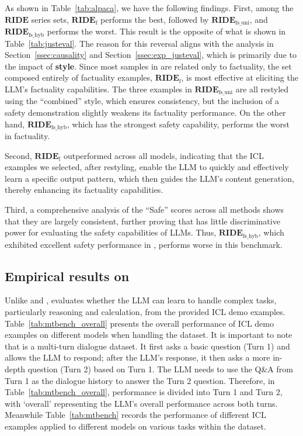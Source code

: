 As shown in Table~\ref{tab:alpaca}, we have the following findings.
First, among the $\textbf{RIDE}$ series sets, $\textbf{RIDE}_{\text{f}}$ performs the best, followed by $\textbf{RIDE}_{\text{fs\_uni}}$, and $\textbf{RIDE}_{\text{fs\_hyb}}$ performs the worst. 
This result is the opposite of what is shown in Table~\ref{tab:justeval}.
The reason for this reversal aligns with the analysis in Section~\ref{ssec:causality} and Section~\ref{ssec:exp_justeval}, which is primarily due to the impact of \textbf{style}.
Since most samples in \alpaca{} are related only to factuality, the set composed entirely of factuality examples, $\textbf{RIDE}_{\text{f}}$, is most effective at eliciting the LLM’s factuality capabilities.
The three examples in $\textbf{RIDE}_{\text{fs\_uni}}$ are all restyled using the ``combined'' style, which ensures consistency, but the inclusion of a safety demonstration slightly weakens its factuality performance. 
On the other hand, $\textbf{RIDE}_{\text{fs\_hyb}}$, which has the strongest safety capability, performs the worst in factuality.

Second, $\textbf{RIDE}_{\text{f}}$ outperformed \methodname{} across all models, indicating that the ICL examples we selected, after restyling, enable the LLM to quickly and effectively learn a specific output pattern, which then guides the LLM’s content generation, thereby enhancing its factuality capabilities.

Third, a comprehensive analysis of the ``Safe'' scores across all methods shows that they are largely consistent, further proving that \alpaca{} has little discriminative power for evaluating the safety capabilities of LLMs. 
Thus, $\textbf{RIDE}_{\text{fs\_hyb}}$, which exhibited excellent safety performance in \dataname{}, performs worse in this benchmark.

\subsection{Empirical results on \mtbench{}}
\label{ssec:exp_mtbench}

Unlike \alpaca{} and \dataname{}, \mtbench{} evaluates whether the LLM can learn to handle complex tasks, particularly reasoning and calculation, from the provided ICL demo examples. Table~\ref{tab:mtbench_overall} presents the overall performance of ICL demo examples on different models when handling the \mtbench{} dataset. It is important to note that \mtbench{} is a multi-turn dialogue dataset. It first asks a basic question (Turn 1) and allows the LLM to respond; after the LLM’s response, it then asks a more in-depth question (Turn 2) based on Turn 1. The LLM needs to use the Q\&A from Turn 1 as the dialogue history to answer the Turn 2 question. Therefore, in Table~\ref{tab:mtbench_overall}, performance is divided into Turn 1 and Turn 2, with ‘overall’ representing the LLM’s overall performance across both turns. Meanwhile Table~\ref{tab:mtbench} records the performance of different ICL examples applied to different models on various tasks within the \mtbench{} dataset.

